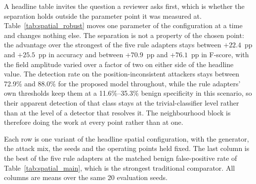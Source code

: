 \documentclass[notspecified,article,submit,moreauthors]{Definitions/mdpi}
\begin{document}
A headline table invites the question a reviewer asks first, which is whether the separation holds outside the parameter point it was measured at. Table~\ref{tab:spatial_robust} moves one parameter of the configuration at a time and changes nothing else. The separation is not a property of the chosen point: the advantage over the strongest of the five rule adapters stays between $+22.4$~pp and $+25.5$~pp in accuracy and between $+70.9$~pp and $+76.1$~pp in F-score, with the field amplitude varied over a factor of two on either side of the headline value. The detection rate on the position-inconsistent attackers stays between 72.9\% and 88.0\% for the proposed model throughout, while the rule adapters' own thresholds keep them at a 11.6\%--35.3\% benign specificity in this scenario, so their apparent detection of that class stays at the trivial-classifier level rather than at the level of a detector that resolves it. The neighbourhood block is therefore doing the work at every point rather than at one.\begin{table}[!htbp]
  \centering
  \caption{Robustness of the spatial separation. Each row changes exactly one parameter of the headline spatial configuration and leaves the generator, the attack mix, the seeds and the operating points alone, so a difference is attributable to that parameter. The last column places the strongest rule adapter at the same benign false-positive rate as Table~\ref{tab:spatial_main}.}
  \label{tab:spatial_robust}
  \footnotesize
  \setlength{\tabcolsep}{4pt}
  \renewcommand{\arraystretch}{1.15}
\par
\vspace{2pt}
\raggedright\scriptsize
Each row is one variant of the headline spatial configuration, with the generator, the attack mix, the seeds and the operating points held fixed. The last column is the best of the five rule adapters at the matched benign false-positive rate of Table~\ref{tab:spatial_main}, which is the strongest traditional comparator. All columns are means over the same 20 evaluation seeds.
\end{table}
\end{document}
